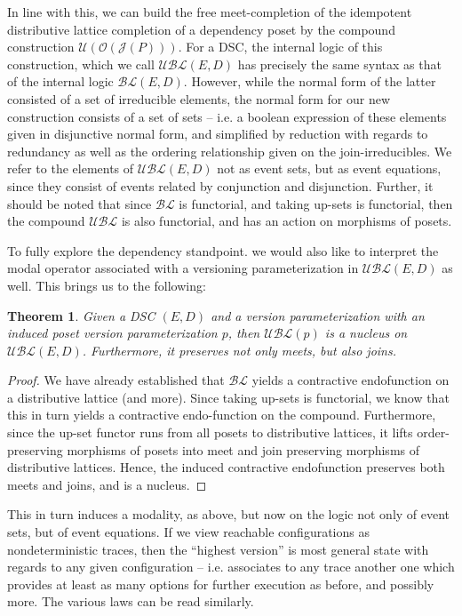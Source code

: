 \documentclass[hoptionsi,review,screen,format=sigconf]{acmart}
\newtheorem{theorem}{Theorem}[section]
\theoremstyle{definition}
\newcommand{\UBLc}{\mathcal{UBL}}
\newcommand{\Oc}{\mathcal{O}}
\newcommand{\Ucc}{\mathcal{U}}
\newcommand{\Jc}{\mathcal{J}}
\newcommand{\BLc}{\mathcal{BL}}
\begin{document}
 In line with this, we can build the free meet-completion of the idempotent distributive lattice completion of a dependency poset by the compound construction \(\Ucc(\Oc(\Jc(P)))\). For a DSC, the internal logic of this construction, which we call \(\UBLc(E,D)\) has precisely the same syntax as that of the internal logic \(\BLc(E,D)\). However, while the normal form of the latter consisted of a set of irreducible elements, the normal form for our new construction consists of a set of sets -- i.e. a boolean expression of these elements given in disjunctive normal form, and simplified by reduction with regards to redundancy as well as the ordering relationship given on the join-irreducibles. We refer to the elements of \(\UBLc(E,D)\) not as event sets, but as event equations, since they consist of events related by conjunction and disjunction. Further, it should be noted that since \(\BLc\) is functorial, and taking up-sets is functorial, then the compound \(\UBLc\) is also functorial, and has an action on morphisms of posets.
 


To fully explore the dependency standpoint. we would also like to interpret the modal operator associated with a versioning parameterization in \(\UBLc(E,D)\) as well. This brings us to the following:

\begin{theorem}
Given a DSC \((E,D)\) and a version parameterization with an induced poset version parameterization \(p\), then \(\UBLc(p)\) is a nucleus on \(\UBLc(E,D)\). Furthermore, it preserves not only meets, but also joins.
\end{theorem}
\begin{proof}
We have already established that \(\BLc\) yields a contractive endofunction on a distributive lattice (and more). Since taking up-sets is functorial, we know that this in turn yields a contractive endo-function on the compound. Furthermore, since the up-set functor runs from all posets to distributive lattices, it lifts order-preserving morphisms of posets into meet and join preserving morphisms of distributive lattices. Hence, the induced contractive endofunction preserves both meets and joins, and is a nucleus.
\end{proof}

This in turn induces a modality, as above, but now on the logic not only of event sets, but of event equations. If we view reachable configurations as nondeterministic traces, then the ``highest version'' is most general state with regards to any given configuration -- i.e. associates to any trace another one which provides at least as many options for further execution as before, and possibly more. The various laws can be read similarly. %
\end{document}
